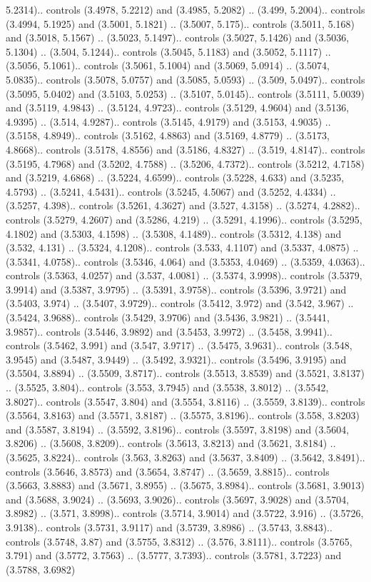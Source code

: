 5.2314).. controls (3.4978, 5.2212) and (3.4985, 5.2082) .. (3.499, 5.2004).. controls (3.4994, 5.1925) and (3.5001, 5.1821) .. (3.5007, 5.175).. controls (3.5011, 5.168) and (3.5018, 5.1567) .. (3.5023, 5.1497).. controls (3.5027, 5.1426) and (3.5036, 5.1304) .. (3.504, 5.1244).. controls (3.5045, 5.1183) and (3.5052, 5.1117) .. (3.5056, 5.1061).. controls (3.5061, 5.1004) and (3.5069, 5.0914) .. (3.5074, 5.0835).. controls (3.5078, 5.0757) and (3.5085, 5.0593) .. (3.509, 5.0497).. controls (3.5095, 5.0402) and (3.5103, 5.0253) .. (3.5107, 5.0145).. controls (3.5111, 5.0039) and (3.5119, 4.9843) .. (3.5124, 4.9723).. controls (3.5129, 4.9604) and (3.5136, 4.9395) .. (3.514, 4.9287).. controls (3.5145, 4.9179) and (3.5153, 4.9035) .. (3.5158, 4.8949).. controls (3.5162, 4.8863) and (3.5169, 4.8779) .. (3.5173, 4.8668).. controls (3.5178, 4.8556) and (3.5186, 4.8327) .. (3.519, 4.8147).. controls (3.5195, 4.7968) and (3.5202, 4.7588) .. (3.5206, 4.7372).. controls (3.5212, 4.7158) and (3.5219, 4.6868) .. (3.5224, 4.6599).. controls (3.5228, 4.633) and (3.5235, 4.5793) .. (3.5241, 4.5431).. controls (3.5245, 4.5067) and (3.5252, 4.4334) .. (3.5257, 4.398).. controls (3.5261, 4.3627) and (3.527, 4.3158) .. (3.5274, 4.2882).. controls (3.5279, 4.2607) and (3.5286, 4.219) .. (3.5291, 4.1996).. controls (3.5295, 4.1802) and (3.5303, 4.1598) .. (3.5308, 4.1489).. controls (3.5312, 4.138) and (3.532, 4.131) .. (3.5324, 4.1208).. controls (3.533, 4.1107) and (3.5337, 4.0875) .. (3.5341, 4.0758).. controls (3.5346, 4.064) and (3.5353, 4.0469) .. (3.5359, 4.0363).. controls (3.5363, 4.0257) and (3.537, 4.0081) .. (3.5374, 3.9998).. controls (3.5379, 3.9914) and (3.5387, 3.9795) .. (3.5391, 3.9758).. controls (3.5396, 3.9721) and (3.5403, 3.974) .. (3.5407, 3.9729).. controls (3.5412, 3.972) and (3.542, 3.967) .. (3.5424, 3.9688).. controls (3.5429, 3.9706) and (3.5436, 3.9821) .. (3.5441, 3.9857).. controls (3.5446, 3.9892) and (3.5453, 3.9972) .. (3.5458, 3.9941).. controls (3.5462, 3.991) and (3.547, 3.9717) .. (3.5475, 3.9631).. controls (3.548, 3.9545) and (3.5487, 3.9449) .. (3.5492, 3.9321).. controls (3.5496, 3.9195) and (3.5504, 3.8894) .. (3.5509, 3.8717).. controls (3.5513, 3.8539) and (3.5521, 3.8137) .. (3.5525, 3.804).. controls (3.553, 3.7945) and (3.5538, 3.8012) .. (3.5542, 3.8027).. controls (3.5547, 3.804) and (3.5554, 3.8116) .. (3.5559, 3.8139).. controls (3.5564, 3.8163) and (3.5571, 3.8187) .. (3.5575, 3.8196).. controls (3.558, 3.8203) and (3.5587, 3.8194) .. (3.5592, 3.8196).. controls (3.5597, 3.8198) and (3.5604, 3.8206) .. (3.5608, 3.8209).. controls (3.5613, 3.8213) and (3.5621, 3.8184) .. (3.5625, 3.8224).. controls (3.563, 3.8263) and (3.5637, 3.8409) .. (3.5642, 3.8491).. controls (3.5646, 3.8573) and (3.5654, 3.8747) .. (3.5659, 3.8815).. controls (3.5663, 3.8883) and (3.5671, 3.8955) .. (3.5675, 3.8984).. controls (3.5681, 3.9013) and (3.5688, 3.9024) .. (3.5693, 3.9026).. controls (3.5697, 3.9028) and (3.5704, 3.8982) .. (3.571, 3.8998).. controls (3.5714, 3.9014) and (3.5722, 3.916) .. (3.5726, 3.9138).. controls (3.5731, 3.9117) and (3.5739, 3.8986) .. (3.5743, 3.8843).. controls (3.5748, 3.87) and (3.5755, 3.8312) .. (3.576, 3.8111).. controls (3.5765, 3.791) and (3.5772, 3.7563) .. (3.5777, 3.7393).. controls (3.5781, 3.7223) and (3.5788, 3.6982) 
